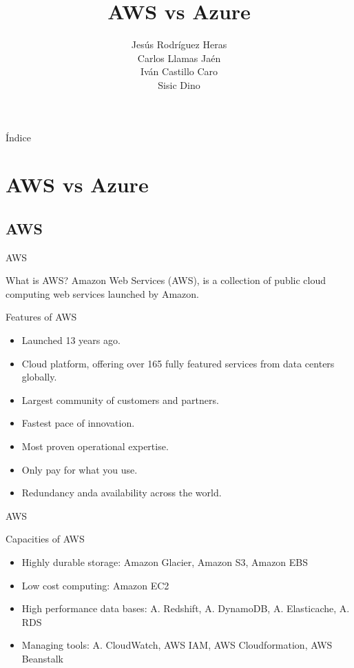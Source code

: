 \documentclass[aspectratio=169]{beamer}
\title{AWS vs Azure}
\author{Jesús Rodríguez Heras\\
Carlos Llamas Jaén\\
Iván Castillo Caro\\
Sisic Dino}
\begin{document}
\begin{frame}
  \titlepage
  
\end{frame}

\begin{frame}{Índice}
\small\tableofcontents
\end{frame}
\normalsize

\section{AWS vs Azure}
\subsection{AWS}
\begin{frame}{AWS}
	\begin{block}{What is AWS?}
		Amazon Web Services (AWS), is a collection of public cloud computing web services launched by Amazon.
	\end{block}
	\begin{block}{Features of AWS}
		\begin{itemize}
			\item Launched 13 years ago.
			\item Cloud platform, offering over 165 fully featured services from data centers globally.
			\item Largest community of customers and partners.
			\item Fastest pace of innovation.
			\item Most proven operational expertise.
			\item Only pay for what you use.
			\item Redundancy anda availability across the world.
		\end{itemize}
	\end{block}
\end{frame}

\begin{frame}{AWS}
	\begin{block}{Capacities of AWS}
		\begin{itemize}
			\item Highly durable storage: Amazon Glacier, Amazon S3, Amazon EBS
			\item Low cost computing: Amazon EC2
			\item High performance data bases: A. Redshift, A. DynamoDB, A. Elasticache, A. RDS
			\item Managing tools: A. CloudWatch, AWS IAM, AWS Cloudformation, AWS Beanstalk
		\end{itemize}
	\end{block}
\end{frame}
\end{document}
